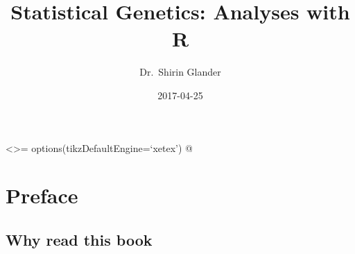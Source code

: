 \documentclass[12pt,]{book}
\title{Statistical Genetics: Analyses with R}
\author{Dr.~Shirin Glander}
\date{2017-04-25}
\begin{document}
\maketitle

{
\hypersetup{linkcolor=black}
\setcounter{tocdepth}{1}
\tableofcontents
}
\listoftables
\listoffigures
\textless{}\textgreater{}= options(tikzDefaultEngine=`xetex') @

\chapter*{Preface}\label{preface}


\section*{Why read this book}\label{why-read-this-book}
\end{document}
